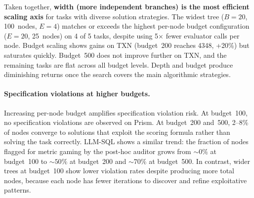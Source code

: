 
Taken together, \textbf{width (more independent branches) is the most efficient scaling axis} for tasks with diverse solution strategies.
The widest tree ($B\!=\!20$, 100~nodes, $E\!=\!4$) matches or exceeds the highest per-node budget configuration ($E\!=\!20$, 25~nodes) on 4 of 5 tasks, despite using 5$\times$ fewer evaluator calls per node.
Budget scaling shows gains on TXN (budget~200 reaches 4348, +20\%) but saturates quickly. Budget~500 does not improve further on TXN, and the remaining tasks are flat across all budget levels.
Depth and budget produce diminishing returns once the search covers the main algorithmic strategies.


\paragraph{Specification violations at higher budgets.}
Increasing per-node budget amplifies specification violation risk.
At budget~100, no specification violations are observed on Prism. At budget~200 and~500, 2--8\% of nodes converge to solutions that exploit the scoring formula rather than solving the task correctly.
LLM-SQL shows a similar trend: the fraction of nodes flagged for metric gaming by the post-hoc auditor grows from ${\sim}0\%$ at budget~100 to ${\sim}50\%$ at budget~200 and ${\sim}70\%$ at budget~500.
In contrast, wider trees at budget~100 show lower violation rates despite producing more total nodes, because each node has fewer iterations to discover and refine exploitative patterns.


